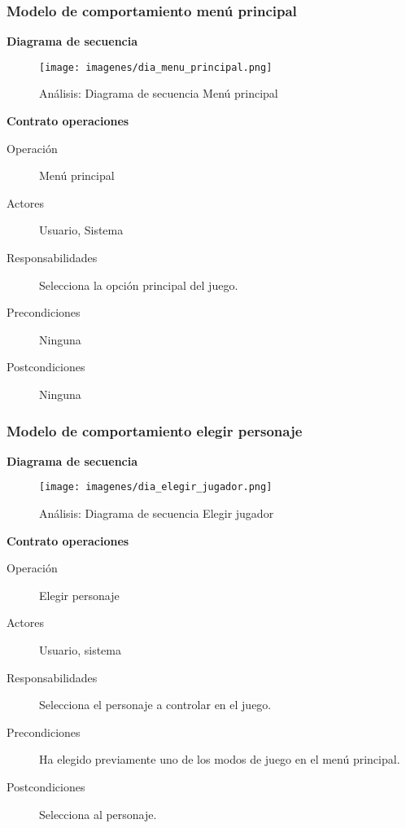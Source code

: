 \subsubsection{Modelo de comportamiento menú principal}

\textbf{Diagrama de secuencia}
\begin{figure}[H]
  \label{dia_menu_principal}
  \begin{center}
    \texttt{[image: imagenes/dia\_menu\_principal.png]}
  \end{center}
  \caption{Análisis: Diagrama de secuencia Menú principal}
\end{figure}

\textbf{Contrato operaciones}

\begin{description}
    \item[Operación] Menú principal
    \item[Actores] Usuario, Sistema
    \item[Responsabilidades] Selecciona la opción principal del juego.
    \item[Precondiciones] Ninguna
    \item[Postcondiciones] Ninguna
\end{description}

\subsubsection{Modelo de comportamiento elegir personaje}

\textbf{Diagrama de secuencia}
\begin{figure}[H]
  \label{dia_elegir_jugador}
  \begin{center}
    \texttt{[image: imagenes/dia\_elegir\_jugador.png]}
  \end{center}
  \caption{Análisis: Diagrama de secuencia Elegir jugador}
\end{figure}

\textbf{Contrato operaciones}

\begin{description}
    \item[Operación] Elegir personaje
    \item[Actores]  Usuario, sistema
    \item[Responsabilidades] Selecciona el personaje a controlar en el juego.
    \item[Precondiciones] Ha elegido previamente uno de los modos de juego en el menú principal.
    \item[Postcondiciones] Selecciona al personaje.
\end{description}


